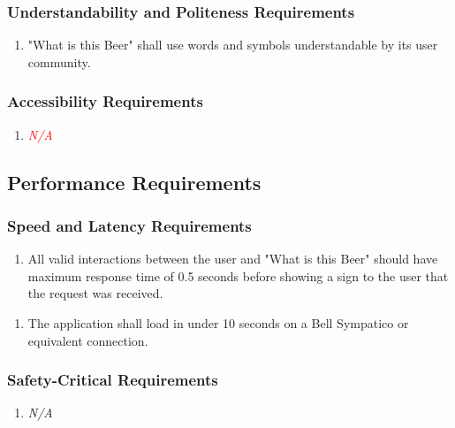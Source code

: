 \documentclass[]{article}
\begin{document}
\subsubsection{Understandability and Politeness Requirements}
\label{ssub:understandability_and_politeness_requirements}
\begin{enumerate}[{UH}1. ]
	\item "What is this Beer" shall use words and symbols understandable by its user community.
\end{enumerate}

\subsubsection{Accessibility Requirements}
\label{ssub:accessibility_requirements}
\begin{enumerate}[{UH}1. ]
	\item \textcolor{red}{\emph{N/A}}
\end{enumerate}


\subsection{Performance Requirements}
\label{sub:performance_requirements}

\subsubsection{Speed and Latency Requirements}
\label{ssub:speed_and_latency_requirements}
\begin{enumerate}[{PR}1. ]
	\item All valid interactions between the user and "What is this Beer" should have maximum response time of 0.5 seconds before showing a sign to the user that the request was received.
\end{enumerate}
\begin{enumerate}[{PR}2. ]
	\item The application shall load in under 10 seconds on a Bell Sympatico or equivalent connection.
\end{enumerate}

\subsubsection{Safety-Critical Requirements}
\label{ssub:safety_critical_requirements}
\begin{enumerate}[{PR}1. ]
	\item \emph{N/A}
\end{enumerate}
\end{document}
